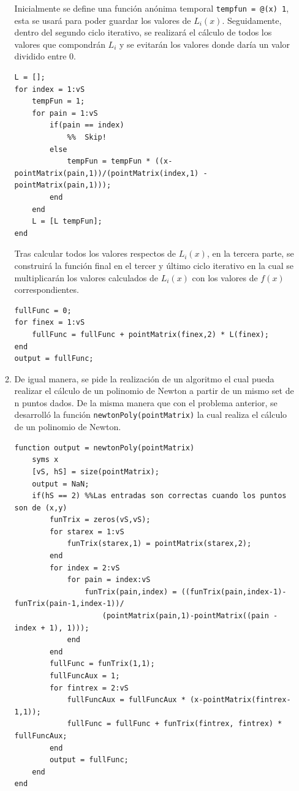 \documentclass[english,notitlepage,letterpaper, 10pt]{article} %
\begin{document}
\begin{enumerate}
\begin{enumerate}
      Inicialmente se define una función anónima temporal \texttt{tempfun = @(x) 1}, esta se usará para poder guardar los valores de $L_i(x)$. Seguidamente, dentro del segundo ciclo iterativo, se realizará el cálculo de todos los valores que compondrán $L_i$ y se evitarán los valores donde daría un valor dividido entre 0.

      \begin{lstlisting}
L = [];
for index = 1:vS
    tempFun = 1;
    for pain = 1:vS
        if(pain == index)
            %%  Skip!
        else
            tempFun = tempFun * ((x-pointMatrix(pain,1))/(pointMatrix(index,1) - pointMatrix(pain,1)));
        end
    end
    L = [L tempFun];
end
      \end{lstlisting}
      
      Tras calcular todos los valores respectos de $L_i(x)$, en la tercera parte, se construirá la función final en el tercer y último ciclo iterativo en la cual se multiplicarán los valores calculados de $L_i(x)$ con los valores de $f(x)$ correspondientes.

      \begin{lstlisting}
fullFunc = 0;
for finex = 1:vS
    fullFunc = fullFunc + pointMatrix(finex,2) * L(finex);
end
output = fullFunc;
      \end{lstlisting}

      \item De igual manera, se pide la realización de un algoritmo el cual pueda realizar el cálculo de un polinomio de Newton a partir de un mismo set de n puntos dados. De la misma manera que con el problema anterior, se desarrolló la función \texttt{newtonPoly(pointMatrix)} la cual realiza el cálculo de un polinomio de Newton.
      
      \begin{lstlisting}
function output = newtonPoly(pointMatrix)
    syms x
    [vS, hS] = size(pointMatrix);
    output = NaN;
    if(hS == 2) %%Las entradas son correctas cuando los puntos son de (x,y)
        funTrix = zeros(vS,vS);
        for starex = 1:vS
            funTrix(starex,1) = pointMatrix(starex,2);
        end
        for index = 2:vS
            for pain = index:vS
                funTrix(pain,index) = ((funTrix(pain,index-1)-funTrix(pain-1,index-1))/
                    (pointMatrix(pain,1)-pointMatrix((pain - index + 1), 1)));
            end
        end
        fullFunc = funTrix(1,1);
        fullFuncAux = 1;
        for fintrex = 2:vS 
            fullFuncAux = fullFuncAux * (x-pointMatrix(fintrex-1,1));
            fullFunc = fullFunc + funTrix(fintrex, fintrex) * fullFuncAux;
        end
        output = fullFunc;
    end 
end
      \end{lstlisting}


\end{enumerate}
\end{enumerate}
\end{document}
